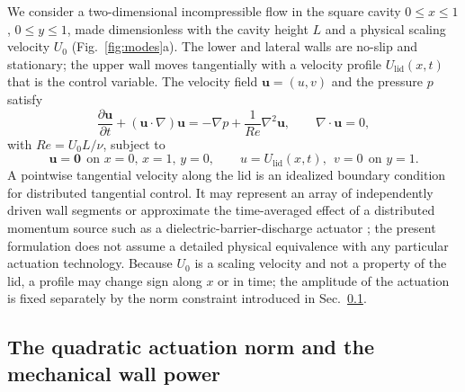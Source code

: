 \documentclass[11pt,a4paper]{article}
\newenvironment{chgadd}{\par\color{blue}}{\par\color{black}}
\begin{document}
\begin{chgadd}
We consider a two-dimensional incompressible flow in the square cavity
$0\le x\le 1$, $0\le y\le 1$, made dimensionless with the cavity height $L$ and a
physical scaling velocity $U_0$ (Fig.~\ref{fig:modes}a). The lower and lateral walls are no-slip and stationary;
the upper wall moves tangentially with a velocity profile
$U_{\mathrm{lid}}(x,t)$ that is the control variable. The velocity field
$\mathbf{u}=(u,v)$ and the pressure $p$ satisfy
\begin{equation}
\frac{\partial\mathbf{u}}{\partial t}+(\mathbf{u}\cdot\nabla)\mathbf{u}
=-\nabla p+\frac{1}{Re}\nabla^{2}\mathbf{u},
\qquad \nabla\cdot\mathbf{u}=0,
\label{eq:ns}
\end{equation}
with $Re=U_0L/\nu$, subject to
\begin{equation}
\mathbf{u}=\mathbf{0}\ \ \text{on } x=0,\,x=1,\,y=0,
\qquad
u=U_{\mathrm{lid}}(x,t),\ \ v=0\ \ \text{on } y=1 .
\label{eq:bc}
\end{equation}
A pointwise tangential velocity along the lid is an idealized boundary condition
for distributed tangential control. It may represent an array of independently
driven wall segments or approximate the time-averaged effect of a distributed
momentum source such as a dielectric-barrier-discharge actuator
\cite{corke2010dbd}; the present formulation does not assume a detailed physical
equivalence with any particular actuation technology. Because $U_0$ is a scaling
velocity and not a property of the lid, a profile may change sign along $x$ or in
time; the amplitude of the actuation is fixed separately by the norm constraint
introduced in Sec.~\ref{sec:norm}.
\end{chgadd}

\subsection{The quadratic actuation norm and the mechanical wall power}
\label{sec:norm}
\end{document}
